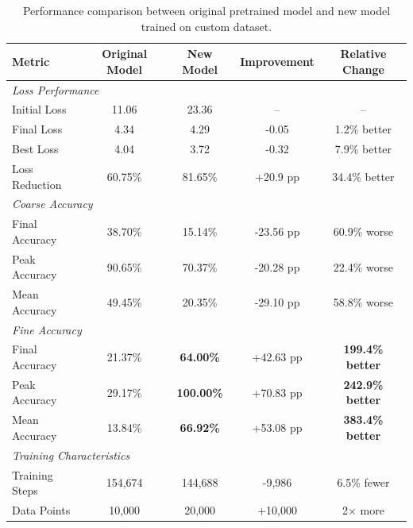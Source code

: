 \begin{table}[htbp]
    \centering
    \caption{Performance comparison between original pretrained model and new model trained on custom dataset.}
    \label{tab:performance_comparison}
    \begin{tabular}{lcccc}
        \toprule
        \textbf{Metric} & \textbf{Original Model} & \textbf{New Model} & \textbf{Improvement} & \textbf{Relative Change} \\
        \midrule
        \multicolumn{5}{l}{\textit{Loss Performance}}                                                                    \\
        Initial Loss    & 11.06                   & 23.36              & --                   & --                       \\
        Final Loss      & 4.34                    & 4.29               & -0.05                & 1.2\% better             \\
        Best Loss       & 4.04                    & 3.72               & -0.32                & 7.9\% better             \\
        Loss Reduction  & 60.75\%                 & 81.65\%            & +20.9 pp             & 34.4\% better            \\
        \midrule
        \multicolumn{5}{l}{\textit{Coarse Accuracy}}                                                                     \\
        Final Accuracy  & 38.70\%                 & 15.14\%            & -23.56 pp            & 60.9\% worse             \\
        Peak Accuracy   & 90.65\%                 & 70.37\%            & -20.28 pp            & 22.4\% worse             \\
        Mean Accuracy   & 49.45\%                 & 20.35\%            & -29.10 pp            & 58.8\% worse             \\
        \midrule
        \multicolumn{5}{l}{\textit{Fine Accuracy}}                                                                       \\
        Final Accuracy  & 21.37\%                 & \textbf{64.00\%}   & +42.63 pp            & \textbf{199.4\% better}  \\
        Peak Accuracy   & 29.17\%                 & \textbf{100.00\%}  & +70.83 pp            & \textbf{242.9\% better}  \\
        Mean Accuracy   & 13.84\%                 & \textbf{66.92\%}   & +53.08 pp            & \textbf{383.4\% better}  \\
        \midrule
        \multicolumn{5}{l}{\textit{Training Characteristics}}                                                            \\
        Training Steps  & 154,674                 & 144,688            & -9,986               & 6.5\% fewer              \\
        Data Points     & 10,000                  & 20,000             & +10,000              & 2× more                  \\
        \bottomrule
    \end{tabular}
\end{table}

